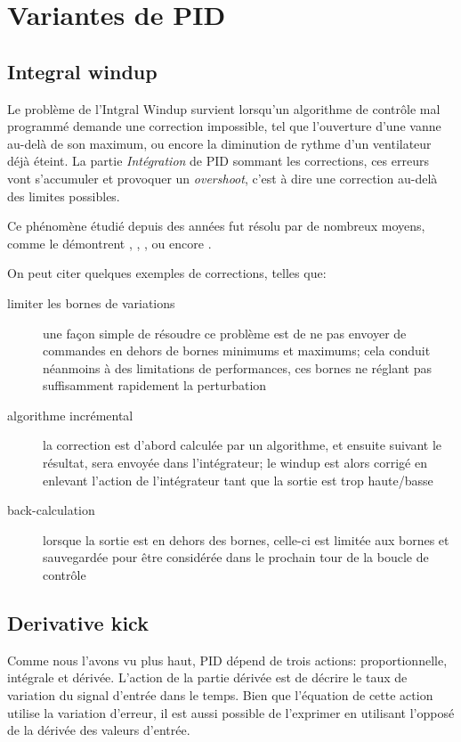 \section{Variantes de PID}

\subsection{Integral windup}
Le problème de l'Intgral Windup survient lorsqu'un algorithme de contrôle mal programmé demande une correction impossible, tel que l'ouverture d'une vanne au-delà de son maximum, ou encore la diminution de rythme d'un ventilateur déjà éteint. La partie \emph{Intégration} de PID sommant les corrections, ces erreurs vont s'accumuler et provoquer un \emph{overshoot}, c'est à dire une correction au-delà des limites possibles.

Ce phénomène étudié depuis des années fut résolu par de nombreux moyens, comme le démontrent \cite{ControlGuruIntegralWindup}, \cite{astrom1995pid}, \cite{shin2012anti}, ou encore \cite{bohn1995analysis}.

On peut citer quelques exemples de corrections, telles que:
\begin{description}
\item[limiter les bornes de variations] une façon simple de résoudre ce problème est de ne pas envoyer de commandes en dehors de bornes minimums et maximums; cela conduit néanmoins à des limitations de performances, ces bornes ne réglant pas suffisamment rapidement la perturbation
\item[algorithme incrémental] la correction est d'abord calculée par un algorithme, et ensuite suivant le résultat, sera envoyée dans l'intégrateur; le windup est alors corrigé en enlevant l'action de l'intégrateur tant que la sortie est trop haute/basse
\item[back-calculation] lorsque la sortie est en dehors des bornes, celle-ci est limitée aux bornes et sauvegardée pour être considérée dans le prochain tour de la boucle de contrôle
\end{description}

\subsection{Derivative kick}
Comme nous l'avons vu plus haut, PID dépend de trois actions: proportionnelle, intégrale et dérivée. L'action de la partie dérivée est de décrire le taux de variation du signal d'entrée dans le temps. Bien que l'équation de cette action utilise la variation d'erreur, il est aussi possible de l'exprimer en utilisant l'opposé de la dérivée des valeurs d'entrée.

